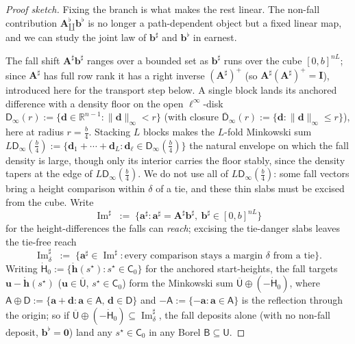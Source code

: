 \documentclass[11pt]{article}
\theoremstyle{definition}
\begin{document}
\begin{proof}[Proof sketch]
\smallskip\noindent Fixing the branch is what makes the rest linear. The non-fall contribution $\mathbf{A}^{\flat}_{\amalg}\mathbf{b}^{\flat}$ is no longer a path-dependent object but a fixed linear map, and we can study the joint law of $\mathbf{b}^{\sharp}$ and $\mathbf{b}^{\flat}$ in earnest.

\smallskip\noindent The fall shift $\mathbf{A}^{\sharp}\mathbf{b}^{\sharp}$ ranges over a bounded set as $\mathbf{b}^{\sharp}$ runs over the cube $[0,b]^{nL}$; since $\mathbf{A}^{\sharp}$ has full row rank it has a right inverse $(\mathbf{A}^{\sharp})^{+}$ (so $\mathbf{A}^{\sharp}(\mathbf{A}^{\sharp})^{+} = \mathbf{I}$), introduced here for the transport step below. A single block lands its anchored difference with a density floor on the open $\ell^\infty$-disk $\mathsf{D}_\infty(r) := \{\mathbf{d}\in\mathbb{R}^{n-1} : \|\mathbf{d}\|_\infty < r\}$ (with closure $\overline{\mathsf{D}}_\infty(r) := \{\mathbf{d} : \|\mathbf{d}\|_\infty\leq r\}$), here at radius $r=\tfrac{b}{4}$. Stacking $L$ blocks makes the $L$-fold Minkowski sum $L\mathsf{D}_\infty(\tfrac{b}{4}) := \{\mathbf{d}_1+\cdots+\mathbf{d}_L : \mathbf{d}_\ell\in\mathsf{D}_\infty(\tfrac{b}{4})\}$ the natural envelope on which the fall density is large, though only its interior carries the floor stably, since the density tapers at the edge of $L\mathsf{D}_\infty(\tfrac{b}{4})$. We do not use all of $L\mathsf{D}_\infty(\tfrac{b}{4})$: some fall vectors bring a height comparison within $\delta$ of a tie, and these thin slabs must be excised from the cube. Write
\[
  \operatorname{Im}^{\sharp} \;:=\; \{\mathbf{a}^{\sharp} : \mathbf{a}^{\sharp} = \mathbf{A}^{\sharp}\mathbf{b}^{\sharp},\ \mathbf{b}^{\sharp}\in[0,b]^{nL}\}
\]
for the height-differences the falls can \emph{reach}; excising the tie-danger slabs leaves the tie-free reach
\[
  \operatorname{Im}^{\sharp}_{\delta} \;:=\; \{\mathbf{a}^{\sharp}\in\operatorname{Im}^{\sharp} : \text{every comparison stays a margin }\delta\text{ from a tie}\} .
\] Writing $\dot{\mathsf{H}}_0 := \{\mathring{\mathbf{h}}(s^{\star}) : s^{\star}\in\mathsf{C}_0\}$ for the anchored start-heights, the fall targets $\mathbf{u}-\mathring{\mathbf{h}}(s^{\star})$ ($\mathbf{u}\in\overline{\mathsf{U}}$, $s^{\star}\in\mathsf{C}_0$) form the Minkowski sum $\overline{\mathsf{U}}\oplus(-\dot{\mathsf{H}}_0)$, where $\mathsf{A}\oplus\mathsf{D} := \{\mathbf{a}+\mathbf{d} : \mathbf{a}\in\mathsf{A},\,\mathbf{d}\in\mathsf{D}\}$ and $-\mathsf{A} := \{-\mathbf{a} : \mathbf{a}\in\mathsf{A}\}$ is the reflection through the origin; so if $\overline{\mathsf{U}}\oplus(-\dot{\mathsf{H}}_0)\subseteq\operatorname{Im}^{\sharp}_{\delta}$, the fall deposits alone (with no non-fall deposit, $\mathbf{b}^{\flat}=\mathbf{0}$) land any $s^{\star}\in\mathsf{C}_0$ in any Borel $\mathsf{B}\subseteq\mathsf{U}$.


\end{proof}
\end{document}
